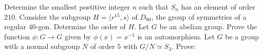 \documentclass{exam}
\begin{document}
\centering
{}
\vspace{1em}

\begin{questions}
    \question[30]
        Determine the smallest postitive integer $n$ such that $S_n$ has an element of order $210$.
    \question[30]
        Consider the subgroup $H = \langle r^{15}, s\rangle$ of $D_{80}$, the group of symmetries of a regular $40$-gon. Determine the order of $H$.
    \question[40]
        Let $G$ be an abelian group. Prove the function $\phi : G \to G$ given by $\phi(x) = x^{-1}$ is an automorphism.
    \question[40]
        Let $G$ be a group with a normal subgroup $N$ of order $5$ with $G/N \simeq S_3$. Prove:
\end{questions}
\end{document}
